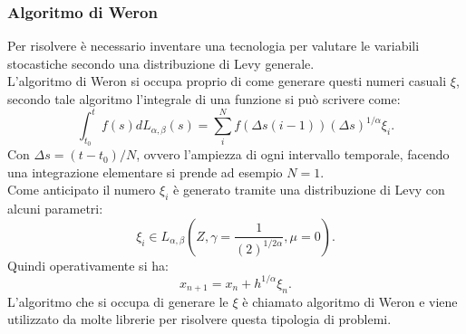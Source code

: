 \subsubsection{Algoritmo di Weron}%
\label{subsub:Algoritmo di Weron}
Per risolvere è necessario inventare una tecnologia per valutare le variabili stocastiche secondo una distribuzione di Levy generale. \\
L'algoritmo di Weron si occupa proprio di come generare questi numeri casuali $\xi$, secondo tale algoritmo l'integrale di una funzione si può scrivere come:
\[
    \int_{t_0}^{t} f(s) dL_{\alpha,\beta  }(s) = \sum_{i}^{N} f(\Delta s(i-1)) \left(\Delta s\right)^{1 /\alpha}\xi_i
.\] 
Con $\Delta s = (t-t_0) /N$, ovvero l'ampiezza di ogni intervallo temporale, facendo una integrazione elementare si prende ad esempio $N=1$.\\
Come anticipato il numero $\xi_i$ è generato tramite una distribuzione di Levy con alcuni parametri:
\[
    \xi_i \in L_{\alpha,\beta  }\left(Z,\gamma =\frac{1}{\left(2\right)^{1 /2\alpha}}, \mu =0\right)
.\] 
Quindi operativamente si ha:
\[
    x_{n+1} = x_n + h ^{1 /\alpha}\xi_n
.\] 
L'algoritmo che si occupa di generare le $\xi$ è chiamato algoritmo di Weron e viene utilizzato da molte librerie per risolvere questa tipologia di problemi.
\clearpage
